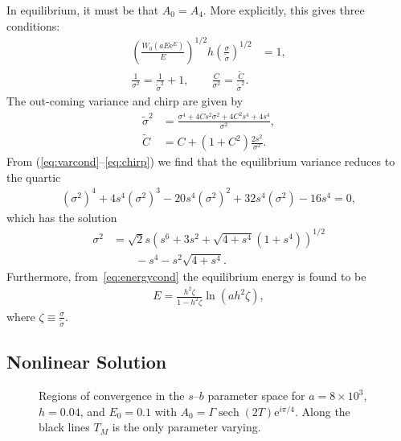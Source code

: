 \documentclass[%
 aps,
 jmp,%
 amsmath,amssymb,
 reprint,%
nofootinbib
]{revtex4-1}
\DeclareMathOperator{\sech}{sech}
\begin{document}
In equilibrium, it must be that $A_0 = A_4$.
More explicitly, this gives three conditions:
\begin{align}
\label{eq:energycond}
	\left( \frac{W_0(a E \textrm{e}^E)}{E} \right)^{1/2} h \left( \frac{\sigma}{\widetilde{\sigma}} \right)^{1/2} &= 1, \\
\label{eq:varcond}
	\frac{1}{\sigma^2} = \frac{1}{\widetilde{\sigma}^2} + 1, \qquad
	\frac{C}{\sigma^2} = \frac{\widetilde{C}}{\widetilde{\sigma}^2}.
\end{align}
The out-coming variance and chirp are given by \cite{agrawal2013}
\begin{align}
\label{eq:variance}
	\widetilde{\sigma}^2 &= \frac{\sigma^4 + 4 C s^2 \sigma^2 + 4 C^2 s^4 +4s^4}{\sigma^2}, \\
\label{eq:chirp}
	\widetilde{C} &= C + \left( 1 + C^2 \right) \frac{2s^2}{\sigma^2}.
\end{align}
From (\ref{eq:varcond}--\ref{eq:chirp}) we find that the equilibrium variance reduces to the quartic
\begin{align*}
\left( \sigma^2 \right)^4 + 4 s^4 \left( \sigma^2 \right)^3 - 20 s^4 \left( \sigma^2 \right)^2 + 32 s^4 \left( \sigma^2 \right) - 16 s^4 = 0,
\end{align*}
which has the solution
\begin{align*}
\sigma^2 &= \sqrt{2} s \left( s^6 + 3s^2 + \sqrt{4 + s^4}(1 + s^4) \right)^{1/2} \\
&\qquad - s^4 - s^2 \sqrt{4 + s^4}.
\end{align*}
Furthermore, from~\eqref{eq:energycond} the equilibrium energy is found to be
\begin{align}
	\label{eq:equilenergy}
	E = \frac{h^2 \zeta}{1 - h^2 \zeta} \ln \left( a h^2 \zeta \right),
\end{align}
where $\displaystyle \zeta \equiv \frac{\sigma}{\widetilde{\sigma}}$.

\subsection{Nonlinear Solution}

\begin{figure*}
\begin{subfigure}[]{0.5\textwidth}

\end{subfigure}%
\begin{subfigure}[]{0.5\textwidth}

\end{subfigure}
\caption{Regions of convergence in the $s$--$b$ parameter space for $a = 8 \times 10^3$, $h = 0.04$, and $E_0 = 0.1$ with $A_0 = \Gamma \sech{(2T)} \textrm{e}^{i \pi / 4}$. Along the black lines $T_M$ is the only parameter varying.}
\label{fig:DMmap}
\end{figure*}
\end{document}

